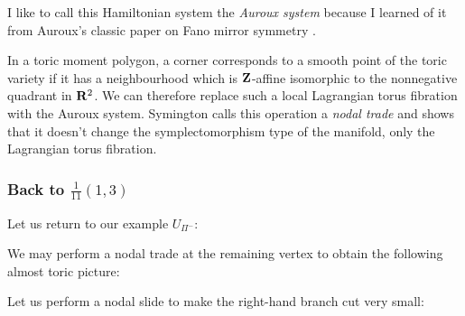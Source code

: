 \documentclass{article}
\begin{document}
\begin{center}
\end{center}
I like to call this Hamiltonian system the {\em Auroux system} because
I learned of it from Auroux's classic paper on Fano mirror symmetry
\cite{Auroux}.


In a toric moment polygon, a corner corresponds to a smooth point of
the toric variety if it has a neighbourhood which is \(\mathbf{Z}\)-affine
isomorphic to the nonnegative quadrant in \(\mathbf{R}^2\). We can therefore
replace such a local Lagrangian torus fibration with the Auroux
system. Symington calls this operation a {\em nodal trade} and shows
{\cite[Theorem 6.5]{Symington}} that it doesn't change the
symplectomorphism type of the manifold, only the Lagrangian torus
fibration.


\subsubsection{Back to \(\frac{1}{11}(1,3)\)}


Let us return to our example \(U_{\Pi^-}\):


\begin{center}
\end{center}
We may perform a nodal trade at the remaining vertex to obtain the
following almost toric picture:


\begin{center}
\end{center}
Let us perform a nodal slide to make the right-hand branch cut very
small:
\end{document}
